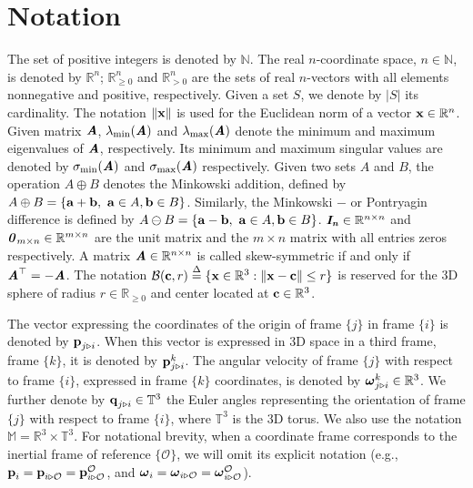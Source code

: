\section{Notation}

The set of positive integers is denoted by $\mathbb{N}$. The real $n$-coordinate
space, $n\in\mathbb{N}$, is denoted by $\mathbb{R}^n$;
$\mathbb{R}^n_{\geq 0}$ and $\mathbb{R}^n_{> 0}$ are the sets of real
$n$-vectors with all elements nonnegative and positive, respectively. Given a
set $S$, we denote by $\lvert S\lvert$ its cardinality. The notation
$\|\bm{\mathbf{x}}\|$ is used for the Euclidean norm of a vector
$\bm{\mathbf{x}} \in \mathbb{R}^n$. Given matrix $\bm{\mathit{A}}$, $\lambda_{\text{min}}(\bm{\mathit{A}})$
and $\lambda_{\text{max}}(\bm{\mathit{A}})$
denote the minimum and maximum eigenvalues of $\bm{\mathit{A}}$, respectively.
Its minimum and maximum singular values are denoted by
$\sigma_{\text{min}}(\bm{\mathit{A}})$ and $\sigma_{\text{max}}(\bm{\mathit{A}})$ respectively.
Given two sets $A$ and $B$, the operation $A \oplus B$ denotes the Minkowski
addition, defined by
$A \oplus B = \{\bm{\mathbf{a}} + \bm{\mathbf{b}},\ \bm{\mathbf{a}} \in A, \bm{\mathbf{b}} \in B\}$. Similarly,
the Minkowski $-$ or Pontryagin difference is defined by
$A \ominus B = \{\bm{\mathbf{a}} - \bm{\mathbf{b}},\ \bm{\mathbf{a}} \in A, \bm{\mathbf{b}} \in B\}$.
$\bm{\mathit{I_n}} \in \mathbb{R}^{n \times n}$ and
$\bm{\mathit{0}}_{m \times n} \in \mathbb{R}^{m \times n}$
are the unit matrix and the $m \times n$ matrix with all entries zeros
respectively.  A matrix $\bm{\mathit{A}} \in \mathbb{R}^{n \times n}$ is called
skew-symmetric if and only if $\bm{\mathit{A}}^\top = -\bm{\mathit{A}}$. The notation
$\mathcal{B}(\bm{\mathbf{c}},r) \overset{\Delta}{=} \{\bm{\mathbf{x}} \in \mathbb{R}^3: \|\bm{\mathbf{x}}-\bm{\mathbf{c}}\| \leq r\}$
is reserved for the 3D sphere of radius $r \in \mathbb{R}_{\ge 0}$ and center
located at $\bm{\mathbf{c}}\in\mathbb{R}^{3}$.

The vector expressing the coordinates of the origin of frame $\{j\}$ in
frame $\{i\}$ is denoted by $\bm{\mathbf{p}}_{j \triangleright i}$. When this vector is
expressed in 3D space in a third frame, frame $\{k\}$, it is denoted by
$\bm{\mathbf{p}}_{j \triangleright i}^{k}$.
The angular velocity of frame $\{j\}$ with respect to frame $\{i\}$, expressed
in frame $\{k\}$ coordinates, is denoted by
$\bm{\mathbf{\omega}}^k_{j \triangleright i}\in \mathbb{R}^{3}$.
We further denote by $\bm{\mathbf{q}}_{j \triangleright i} \in \mathbb{T}^3$
the Euler angles representing the orientation of frame $\{j\}$ with respect to
frame $\{i\}$, where $\mathbb{T}^3$ is the $3$D torus.
We also use the notation $\mathbb{M} = \mathbb{R}^3\times \mathbb{T}^3$.
For notational brevity, when a coordinate frame corresponds to the inertial frame
of reference $\{\mathcal{O}\}$, we will omit its explicit notation
(e.g., $\bm{\mathbf{p}}_i = \bm{\mathbf{p}}_{i \triangleright \mathcal{O}} = \bm{\mathbf{p}}^\mathcal{O}_{i \triangleright \mathcal{O}}$, and
$\bm{\mathbf{\omega}}_i = \bm{\mathbf{\omega}}_{i \triangleright \mathcal{O}} = \bm{\mathbf{\omega}}^\mathcal{O}_{i \triangleright \mathcal{O}}$).
